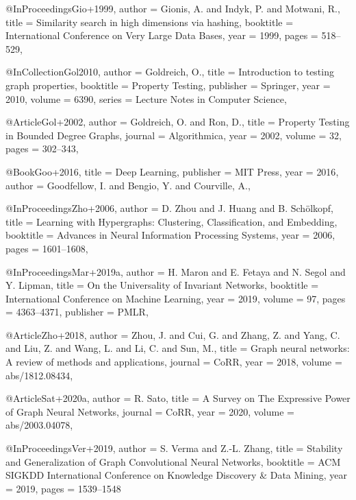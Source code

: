 @InProceedings{Gio+1999,
  author    = {Gionis, A. and Indyk, P. and Motwani, R.},
  title     = {Similarity search in high dimensions via hashing},
  booktitle = {International Conference on Very Large Data Bases},
  year      = {1999},
  pages     = {518--529},
}

@InCollection{Gol2010,
  author    = {Goldreich, O.},
  title     = {Introduction to testing graph properties},
  booktitle = {Property Testing},
  publisher = {Springer},
  year      = {2010},
  volume    = {6390},
  series    = {Lecture Notes in Computer Science},
}

@Article{Gol+2002,
  author  = {Goldreich, O. and Ron, D.},
  title   = {Property Testing in Bounded Degree Graphs},
  journal = {Algorithmica},
  year    = {2002},
  volume  = {32},
  pages   = {302--343},
}

@Book{Goo+2016,
  title     = {Deep Learning},
  publisher = {MIT Press},
  year      = {2016},
  author    = {Goodfellow, I. and Bengio, Y. and Courville, A.},
}

@InProceedings{Zho+2006,
  author    = {D. Zhou and J. Huang and B. Sch{\"{o}}lkopf},
  title     = {Learning with Hypergraphs: Clustering, Classification, and Embedding},
  booktitle = {Advances in Neural Information Processing Systems},
  year      = {2006},
  pages     = {1601--1608},
}

@InProceedings{Mar+2019a,
  author    = {H. Maron and E. Fetaya and N. Segol and Y. Lipman},
  title     = {On the Universality of Invariant Networks},
  booktitle = {International Conference on Machine Learning},
  year      = {2019},
  volume    = {97},
  pages     = {4363--4371},
  publisher = {{PMLR}},
}

@Article{Zho+2018,
  author  = {Zhou, J. and Cui, G. and Zhang, Z. and Yang, C. and Liu, Z. and Wang, L. and Li, C. and Sun, M.},
  title   = {Graph neural networks: A review of methods and applications},
  journal = {CoRR},
  year    = {2018},
  volume  = {abs/1812.08434},
}

@Article{Sat+2020a,
  author  = {R. Sato},
  title   = {A Survey on The Expressive Power of Graph Neural Networks},
  journal = {CoRR},
  year    = {2020},
  volume  = {abs/2003.04078},
}

@InProceedings{Ver+2019,
  author    = {S. Verma and Z.{-}L. Zhang},
  title     = {Stability and Generalization of Graph Convolutional Neural Networks},
  booktitle = {{ACM} {SIGKDD} International Conference on Knowledge Discovery {\&} Data Mining},
  year      = {2019},
  pages     = {1539--1548}
}

